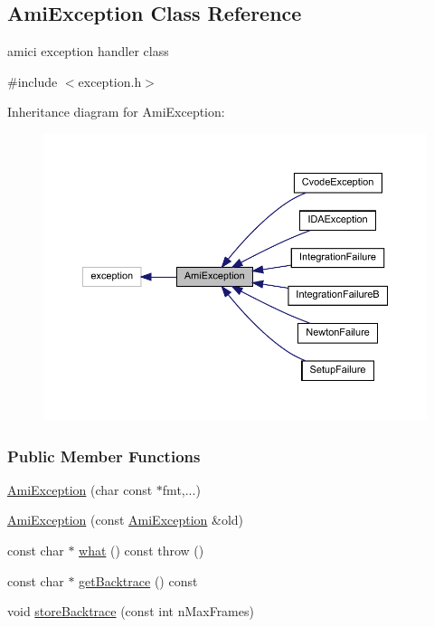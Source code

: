 \hypertarget{classamici_1_1_ami_exception}{}\subsection{Ami\+Exception Class Reference}
\label{classamici_1_1_ami_exception}


amici exception handler class  




{\ttfamily \#include $<$exception.\+h$>$}



Inheritance diagram for Ami\+Exception\+:
\nopagebreak
\begin{figure}[H]
\begin{center}
\leavevmode
\includegraphics[width=350pt]{classamici_1_1_ami_exception__inherit__graph}
\end{center}
\end{figure}
\subsubsection*{Public Member Functions}
\begin{DoxyCompactItemize}
\item 
\mbox{\hyperlink{classamici_1_1_ami_exception_a002ee872acedd472df0550357a67393c}{Ami\+Exception}} (char const $\ast$fmt,...)
\item 
\mbox{\hyperlink{classamici_1_1_ami_exception_a0e9ee88cdcbd1965e44d2d94cc6eb16e}{Ami\+Exception}} (const \mbox{\hyperlink{classamici_1_1_ami_exception}{Ami\+Exception}} \&old)
\item 
const char $\ast$ \mbox{\hyperlink{classamici_1_1_ami_exception_a79009ed133fa02b942ddce8f0b987f3e}{what}} () const  throw ()
\item 
const char $\ast$ \mbox{\hyperlink{classamici_1_1_ami_exception_abd4eec3294e3af56ff54130ca3f2dea9}{get\+Backtrace}} () const
\item 
void \mbox{\hyperlink{classamici_1_1_ami_exception_a795d2a9009cbc53d5a602e621a3a6450}{store\+Backtrace}} (const int n\+Max\+Frames)
\end{DoxyCompactItemize}


